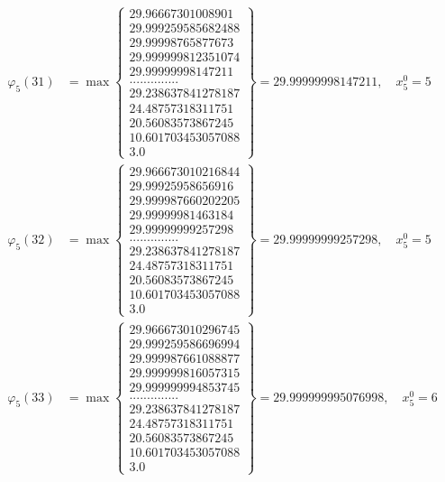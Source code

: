 \documentclass{article}
\begin{document}
\begin{align*}
  
  
  
\varphi_{5}(31) &= \max \left\{ \begin{array}{c}
29.96667301008901 \\
 29.999259585682488 \\
 29.99998765877673 \\
 29.999999812351074 \\
 29.99999998147211 \\
 .............. \\
 29.238637841278187 \\
 24.48757318311751 \\
 20.56083573867245 \\
 10.601703453057088 \\
 3.0
\end{array} \right\} = 29.99999998147211, \quad x_{5}^0 = 5\\
  
  
  
  
\varphi_{5}(32) &= \max \left\{ \begin{array}{c}
29.966673010216844 \\
 29.99925958656916 \\
 29.999987660202205 \\
 29.99999981463184 \\
 29.99999999257298 \\
 .............. \\
 29.238637841278187 \\
 24.48757318311751 \\
 20.56083573867245 \\
 10.601703453057088 \\
 3.0
\end{array} \right\} = 29.99999999257298, \quad x_{5}^0 = 5\\
  
  
  
  
\varphi_{5}(33) &= \max \left\{ \begin{array}{c}
29.966673010296745 \\
 29.999259586696994 \\
 29.999987661088877 \\
 29.999999816057315 \\
 29.999999994853745 \\
 .............. \\
 29.238637841278187 \\
 24.48757318311751 \\
 20.56083573867245 \\
 10.601703453057088 \\
 3.0
\end{array} \right\} = 29.999999995076998, \quad x_{5}^0 = 6\\
  

\end{align*}
\end{document}
